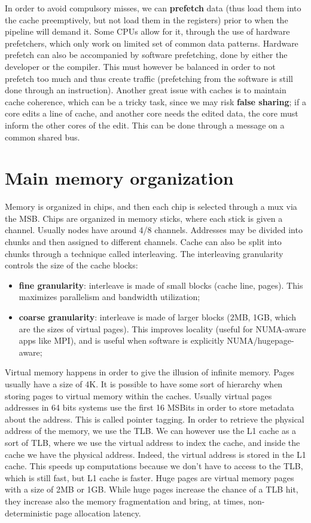 In order to avoid compulsory misses, we can \textbf{prefetch} data (thus load them into the cache preemptively, but not load them in the registers) prior to when the pipeline will demand it. Some CPUs allow for it, through the use of hardware prefetchers, which only work on limited set of common data patterns. Hardware prefetch can also be accompanied by software prefetching, done by either the developer or the compiler. This must however be balanced in order to not prefetch too much and thus create traffic (prefetching from the software is still done through an instruction).
\nwl
Another great issue with caches is to maintain cache coherence, which can be a tricky task, since we may risk \textbf{false sharing}; if a core edits a line of cache, and another core needs the edited data, the core must inform the other cores of the edit. This can be done through a message on a common shared bus.

\section{Main memory organization}

Memory is organized in chips, and then each chip is selected through a mux via the MSB. Chips are organized in memory sticks, where each stick is given a channel. Usually nodes have around 4/8 channels. Addresses may be divided into chunks and then assigned to different channels. Cache can also be split into chunks through a technique called interleaving. The interleaving granularity controls the size of the cache blocks:
\begin{itemize}
    \item \textbf{fine granularity}: interleave is made of small blocks (cache line, pages). This maximizes parallelism and bandwidth utilization;
    \item \textbf{coarse granularity}: interleave is made of larger blocks (2MB, 1GB, which are the sizes of virtual pages). This improves locality (useful for NUMA-aware apps like MPI), and is useful when software is explicitly NUMA/hugepage-aware;
\end{itemize}

Virtual memory happens in order to give the illusion of infinite memory. Pages usually have a size of 4K. It is possible to have some sort of hierarchy when storing pages to virtual memory within the caches. Usually virtual pages addresses in 64 bits systems use the first 16 MSBits in order to store metadata about the address. This is called pointer tagging.
\nwl
In order to retrieve the physical address of the memory, we use the TLB. We can however use the L1 cache as a sort of TLB, where we use the virtual address to index the cache, and inside the cache we have the physical address. Indeed, the virtual address is stored in the L1 cache. This speeds up computations because we don't have to access to the TLB, which is still fast, but L1 cache is faster.
\nwl
Huge pages are virtual memory pages with a size of 2MB or 1GB. While huge pages increase the chance of a TLB hit, they increase also the memory fragmentation and bring, at times, non-deterministic page allocation latency.

